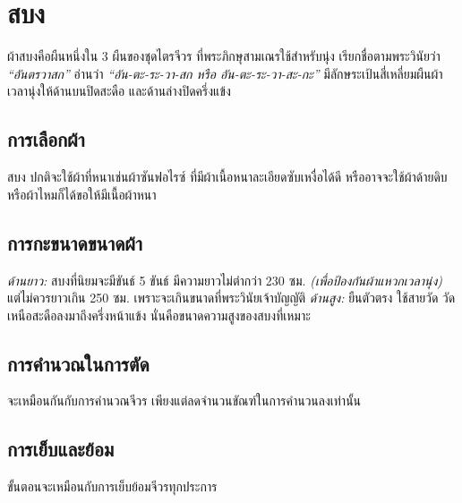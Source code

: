\chapter{สบง}

ผ้าสบงคือผืนหนึ่งใน 3 ผืนของชุดไตรจีวร ที่พระภิกษุสามเณรใช้สำหรับนุ่ง เรียกชื่อตามพระวินัยว่า
\emph{``อันตรวาสก''} อ่านว่า \emph{``อัน-ตะ-ระ-วา-สก หรือ
อัน-ตะ-ระ-วา-สะ-กะ''} มีลักษระเป้นสี่เหลี่ยมผืนผ้า เวลานุ่งให้ด้านบนปิดสะดือ
และด้านล่างปิดครึ่งแข้ง

\section{การเลือกผ้า}

สบง ปกติจะใช้ผ้าที่หนาเช่นผ้าซันฟอไรซ์ ที่มีผ้าเนื้อหนาละเอียดซับเหงื่อได้ดี
หรืออาจจะใช้ผ้าด้ายดิบหรือผ้าไหมก็ได้ขอให้มีเนื้อผ้าหนา

\section{การกะขนาดขนาดผ้า}

\emph{ด้านยาว:} สบงที่นิยมจะมีขันธ์ 5 ขันธ์ มีความยาวไม่ตำกว่า 230 ซม.
\emph{(เพื่อป้องกันผ้าแหวกเวลานุ่ง)} แต่ไม่ควรยาวเกิน 250 ซม.
เพราะจะเกินขนาดที่พระวินัยเจ้าบัญญัติ \emph{ด้านสูง:} ยืนตัวตรง ใช้สายวัด
วัดเหนือสะดือลงมาถึงครึ่งหน้าแข้ง นั่นคือขนาดความสูงของสบงที่เหมาะ

\section{การคำนวณในการตัด}

จะเหมือนกันกับการคำนวณจีวร เพียงแต่ลดจำนวนขัณฑ์ในการคำนวนลงเท่านั้น

\section{การเย็บและย้อม}

ขั้นตอนจะเหมือนกับการเย็บย้อมจีวรทุกประการ

